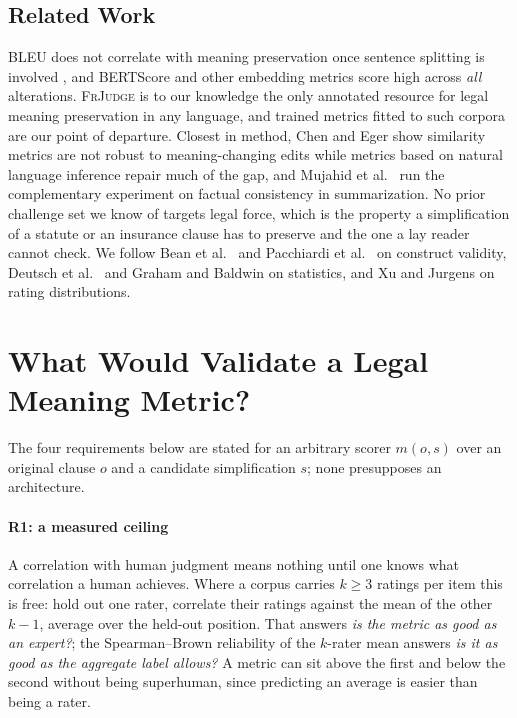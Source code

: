 \documentclass{BVP_JCLLT}
\begin{document}
\subsection{Related Work}\label{sec:related}

BLEU does not correlate with meaning preservation once sentence splitting is
involved \cite{sulem2018bleu}, and BERTScore \cite{zhang2019bertscore} and other
embedding metrics score high across \emph{all} alterations. \textsc{FrJudge}
\cite{beauchemin2025judgebert} is to our knowledge the only annotated resource
for legal meaning preservation in any language, and trained metrics fitted to
such corpora \cite{beauchemin2023meaningbert} are our point of departure.
Closest in method, Chen and Eger \cite{chen2023menli} show similarity metrics are
not robust to meaning-changing edits while metrics based on natural language
inference repair much of the gap, and Mujahid et al.\ \cite{mujahid2026stress}
run the complementary experiment on factual consistency in summarization. No
prior challenge set we know of targets legal force, which is the property a
simplification of a statute or an insurance clause has to preserve and the one a
lay reader cannot check. We follow Bean et al.\ \cite{bean2025construct} and
Pacchiardi et al.\ \cite{pacchiardi2024cleverhans} on construct validity, Deutsch
et al.\ \cite{deutsch2021statistical} and Graham and Baldwin
\cite{graham2014williams} on statistics, and Xu and Jurgens
\cite{xu2026disagreement} on rating distributions.

\section{What Would Validate a Legal Meaning Metric?}\label{sec:protocol}

The four requirements below are stated for an arbitrary scorer $m(o,s)$ over an
original clause $o$ and a candidate simplification $s$; none presupposes an
architecture.

\paragraph{R1: a measured ceiling}
A correlation with human judgment means nothing until one knows what correlation
a human achieves. Where a corpus carries $k \geq 3$ ratings per item this is
free: hold out one rater, correlate their ratings against the mean of the other
$k-1$, average over the held-out position. That answers \emph{is the metric as
good as an expert?}; the Spearman--Brown reliability of the $k$-rater mean
answers \emph{is it as good as the aggregate label allows?} A metric can sit
above the first and below the second without being superhuman, since predicting
an average is easier than being a rater.
\end{document}
